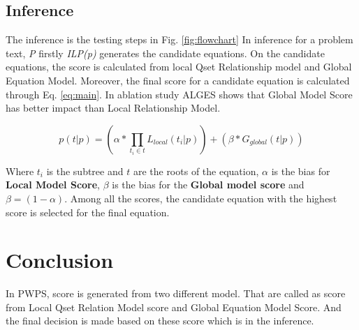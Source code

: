 \documentclass[document.tex]{subfiles}
\begin{document}
\subsection{Inference}
The inference is the testing steps in Fig. \ref{fig:flowchart} In inference for a problem text, \textit{P} firstly \textit{ILP(p)} generates the candidate equations. On the candidate equations, the score is calculated from local Qset Relationship model and Global Equation Model. Moreover, the final score for a candidate equation is calculated through Eq. \ref{eq:main}. In ablation study ALGES shows that Global Model Score has better impact than Local Relationship Model.

\begin{equation}
	p(t|p) = (\alpha * \prod_{t_i \in t} L_{local}(t_i | p) ) + (\beta * G_{global}(t|p))
	\label{eq:main}
\end{equation}

Where $t_i$ is the subtree and $t$ are the roots of the equation, $\alpha$ is the bias for \textbf{Local Model Score}, $\beta$ is the bias for the \textbf{Global model score} and $\beta = (1 - \alpha)$. Among all the scores, the candidate equation with the highest score is selected for the final equation.

\section{Conclusion}
In PWPS, score is generated from two different model. That are called as score from Local Qset Relation Model score and Global Equation Model Score. And the final decision is made based on these score which is in the inference.
\end{document}
